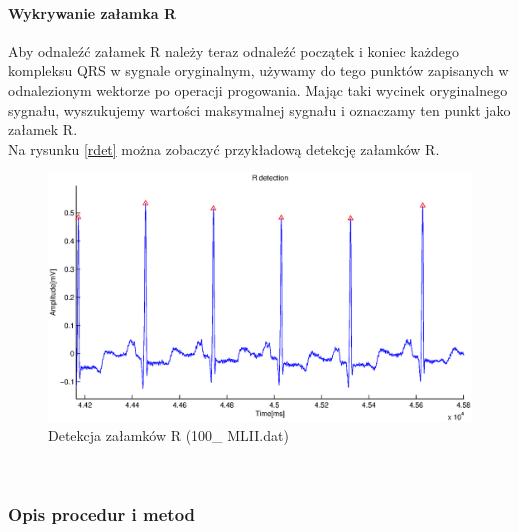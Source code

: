 \documentclass[a4paper, 11pt]{article}
\begin{document}
\paragraph{Wykrywanie załamka R}
\indent Aby odnaleźć załamek R należy teraz odnaleźć początek i koniec każdego kompleksu QRS w sygnale oryginalnym, używamy do tego punktów zapisanych w odnalezionym wektorze po operacji progowania. Mając taki wycinek oryginalnego sygnału, wyszukujemy wartości maksymalnej sygnału i oznaczamy ten punkt jako załamek R.\\
Na rysunku \eqref{rdet} można zobaczyć przykładową detekcję załamków R.
\begin{figure}[ht]
\centering
\includegraphics[scale=0.5]{include/rpeaks.eps}
\caption{Detekcja załamków R (100\_ MLII.dat)}
\label{rdet}
\end{figure}\\

\subsubsection{Opis procedur i metod}
\label{sec:rs:procs}
\end{document}
